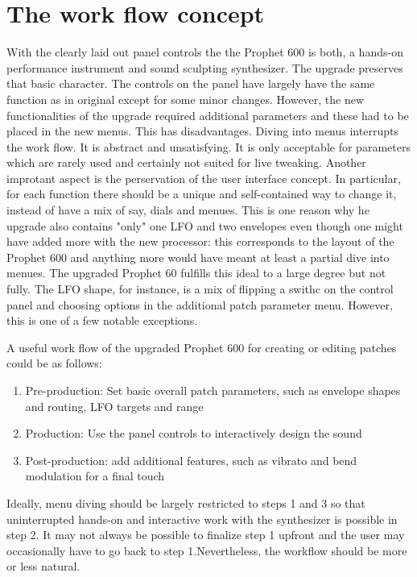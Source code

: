 \documentclass[draft,landscape, 11pt, oneside]{report}
\newenvironment{flowtext}{\addmargin[0cm]{7cm}}{\endaddmargin} %
\begin{document}
\begin{flowtext}
\section{The work flow concept}

With the clearly laid out panel controls the the Prophet 600 is both, a hands-on performance instrument and sound sculpting synthesizer. The upgrade preserves that basic character. The controls on the panel have largely have the same function as in original except for some minor changes. However, the new functionalities of the upgrade required additional parameters and these had to be placed in the new menus. This has disadvantages. Diving into menus interrupts the work flow. It is abstract and unsatisfying. It is only acceptable for parameters which are rarely used and certainly not suited for live tweaking. Another improtant aspect is the perservation of the user interface concept. In particular, for each function there should be a unique and self-contained way to change it, instead of have a mix of say, dials and menues. This is one reason why he upgrade also contains "only" one LFO and two envelopes even though one might have added more with the new processor: this corresponds to the layout of the Prophet 600 and anything more would have meant at least a partial dive into menues. The upgraded Prophet 60 fulfills this ideal to a large degree but not fully. The LFO shape, for instance, is a mix of flipping a swithc on the control panel and choosing options in the additional patch parameter menu. However, this is one of a few notable exceptions.

A useful work flow of the upgraded Prophet 600 for creating or editing patches could be as follows:

\begin{enumerate}
  \item Pre-production: Set basic overall patch parameters, such as envelope shapes and routing, LFO targets and range 
  \item Production: Use the panel controls to interactively design the sound 
  \item Post-production: add additional features, such as vibrato and bend modulation for a final touch
\end{enumerate} 

Ideally, menu diving should be largely restricted to steps 1 and 3 so that uninterrupted hands-on and interactive work with the synthesizer is possible in step 2. It may not always be possible to finalize step 1 upfront and the user may occasionally have to go back to step 1.Nevertheless, the workflow should be more or less natural.


\end{flowtext}
\end{document}
